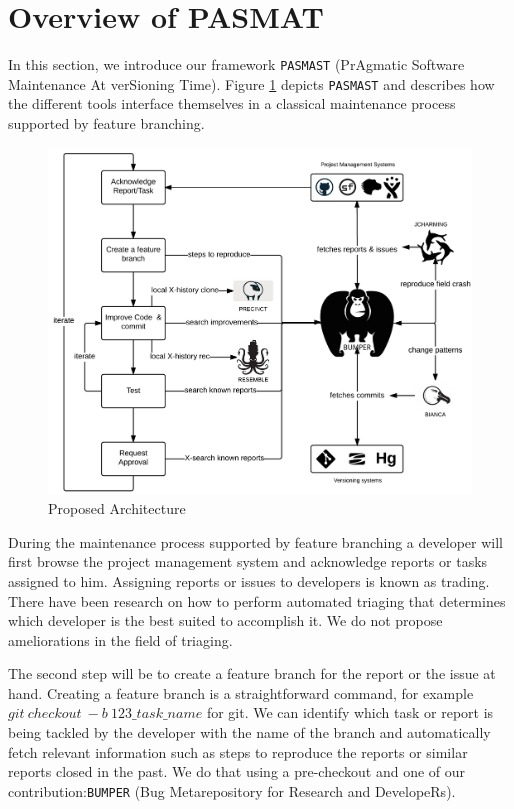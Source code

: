 \section{Overview of PASMAT\label{sec:overview}}

In this section, we introduce our framework {\tt PASMAST} (PrAgmatic Software Maintenance At verSioning Time).
Figure \ref{fig:proposal} depicts {\tt PASMAST} and describes how the different tools interface themselves in a classical maintenance process supported by feature branching.

\begin{figure}[h!]
	\centering
	\includegraphics[scale=0.20]{media/proposal.png}
	\caption{Proposed Architecture}
	\label{fig:proposal}
\end{figure}

During the maintenance process supported by feature branching a developer will first browse the project management system and acknowledge reports or tasks assigned to him.
Assigning reports or issues to developers is known as trading.
There have been research on how to perform automated triaging that determines which developer is the best suited to accomplish it\cite{Saha2014, Tamrawi2011, Bortis2013}.
We do not propose ameliorations in the field of triaging.

The second step will be to create a feature branch for the report or the issue at hand.
Creating a feature branch is a straightforward command, for example $git~checkout~-b~123\_task\_name$ for git.
We can identify which task or report is being tackled by the developer with the name of the branch and automatically fetch relevant information such as steps to reproduce the reports or similar reports closed in the past.
We do that using a pre-checkout and one of our contribution:{\tt BUMPER} (Bug Metarepository for Research and DevelopeRs).

